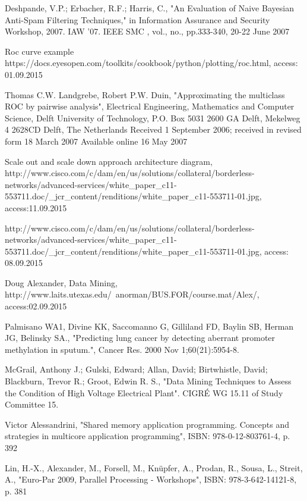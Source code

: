 \begin{thebibliography}{99}
Deshpande, V.P.; Erbacher, R.F.; Harris, C., "An Evaluation of Naive Bayesian Anti-Spam Filtering Techniques," in Information Assurance and Security Workshop, 2007. IAW '07. IEEE SMC , vol., no., pp.333-340, 20-22 June 2007

Roc curve example https://docs.eyesopen.com/toolkits/cookbook/python/plotting/roc.html, access: 01.09.2015

Thomas C.W. Landgrebe, Robert P.W. Duin, "Approximating the multiclass ROC by pairwise analysis", Electrical Engineering, Mathematics and Computer Science, Delft University of Technology, P.O. Box 5031 2600 GA Delft,
Mekelweg 4 2628CD Delft, The Netherlands
Received 1 September 2006; received in revised form 18 March 2007
Available online 16 May 2007

Scale out and scale down approach architecture diagram, http://www.cisco.com/c/dam/en/us/solutions/collateral/borderless-networks/advanced-services/white\_paper\_c11-553711.doc/\_jcr\_content/renditions/white\_paper\_c11-553711-01.jpg, access:11.09.2015

http://www.cisco.com/c/dam/en/us/solutions/collateral/borderless-networks/advanced-services/white\_paper\_c11-553711.doc/\_jcr\_content/renditions/white\_paper\_c11-553711-01.jpg, access: 08.09.2015

Doug Alexander, Data Mining, http://www.laits.utexas.edu/~anorman/BUS.FOR/course.mat/Alex/, access:02.09.2015

Palmisano WA1, Divine KK, Saccomanno G, Gilliland FD, Baylin SB, Herman JG, Belinsky SA., "Predicting lung cancer by detecting aberrant promoter methylation in sputum.", Cancer Res. 2000 Nov 1;60(21):5954-8.

McGrail, Anthony J.; Gulski, Edward; Allan, David; Birtwhistle, David; Blackburn, Trevor R.; Groot, Edwin R. S., "Data Mining Techniques to Assess the Condition of High Voltage Electrical Plant". CIGRÉ WG 15.11 of Study Committee 15.

Victor Alessandrini, "Shared memory application programming. Concepts and strategies in multicore application programming", ISBN: 978-0-12-803761-4, p. 392

Lin, H.-X., Alexander, M., Forsell, M., Knüpfer, A., Prodan, R., Sousa, L., Streit, A., "Euro-Par 2009, Parallel Processing - Workshops", ISBN: 978-3-642-14121-8, p. 381

\end{thebibliography}

